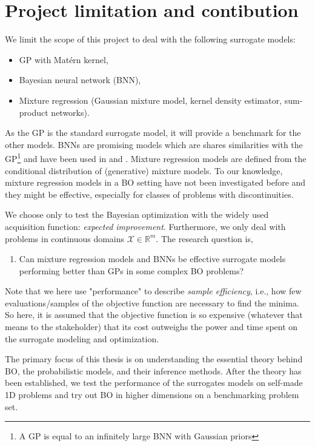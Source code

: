  \section{Project limitation and contibution}
We limit the scope of this project to deal with the following surrogate models:
\begin{itemize}[noitemsep]
    \item GP with Matérn kernel,
    \item Bayesian neural network (BNN),
    \item Mixture regression (Gaussian mixture model, kernel density estimator, sum-product networks).
\end{itemize}
As the GP is the standard surrogate model, it will provide a benchmark for the other models. BNNs
are promising models which are shares similarities with the GP\footnote{A GP is equal to an
infinitely large BNN with Gaussian priors} and have been used in \cite{PhDthesis} and
\cite{BOHAMIANN}. Mixture regression models are defined from the conditional distribution of
(generative) mixture models. To our knowledge, mixture regression models in a BO setting have
not been investigated before and they might be effective, especially for classes of problems
with discontinuities.

We choose only to test the Bayesian optimization with the widely used acquisition function:
\textit{expected improvement}. Furthermore, we only deal with problems in continuous domains
$\mathcal{X} \in \mathbb{R}^m$. The research question is,

\begin{enumerate}[noitemsep]
    \item Can mixture regression models and BNNs be effective surrogate models
    performing better than GPs in some complex BO problems? 
\end{enumerate}

Note that we here use "performance" to describe \textit{sample efficiency}, i.e., how few evaluations/samples
of the objective function are necessary to find the minima. So here, it is assumed that the objective
function is so expensive (whatever that means to the stakeholder) that its cost outweighs the power
and time spent on the surrogate modeling and optimization.

The primary focus of this thesis is on understanding the essential theory behind BO, the probabilistic
models, and their inference methods. After the theory has been established, we test the performance of the
surrogates models on self-made 1D problems and try out BO in higher dimensions on a benchmarking
problem set. 

